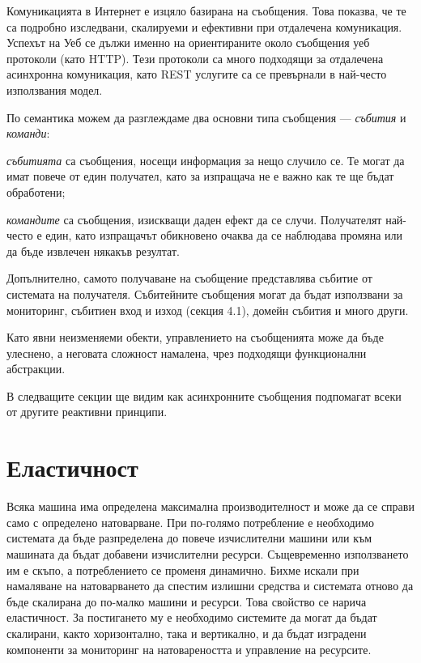 Комуникацията в Интернет е изцяло базирана на съобщения. Това показва, че те са подробно изследвани, скалируеми и ефективни при отдалечена комуникация. Успехът на Уеб се дължи именно на ориентираните около съобщения уеб протоколи (като HTTP). Тези протоколи са много подходящи за отдалечена асинхронна комуникация, като REST услугите са се превърнали в най-често използвания модел.

По семантика можем да разглеждаме два основни типа съобщения — \emph{събития} и \emph{команди}:

\begin{itemize*}
  \item \emph{събитията} са съобщения, носещи информация за нещо случило се. Те могат да имат повече от един получател, като за изпращача не е важно как те ще бъдат обработени;
  \item \emph{командите} са съобщения, изискващи даден ефект да се случи. Получателят най-често е един, като изпращачът обикновено очаква да се наблюдава промяна или да бъде извлечен някакъв резултат.
\end{itemize*}

Допълнително, самото получаване на съобщение представлява събитие от системата на получателя. Събитейните съобщения могат да бъдат използвани за мониторинг, събитиен вход и изход (секция 4.1), домейн събития и много други.

Като явни неизменяеми обекти, управлението на съобщенията може да бъде улеснено, а неговата сложност намалена, чрез подходящи функционални абстракции.

В следващите секции ще видим как асинхронните съобщения подпомагат всеки от другите реактивни принципи.

\section{Еластичност}

Всяка машина има определена максимална производителност и може да се справи само с определено натоварване. При по-голямо потребление е необходимо системата да бъде разпределена до повече изчислителни машини или към машината да бъдат добавени изчислителни ресурси. Същевременно използването им е скъпо, а потреблението се променя динамично. Бихме искали при намаляване на натоварването да спестим излишни средства и системата отново да бъде скалирана до по-малко машини и ресурси. Това свойство се нарича еластичност. За постигането му е необходимо системите да могат да бъдат скалирани, както хоризонтално, така и вертикално, и да бъдат изградени компоненти за мониторинг на натовареността и управление на ресурсите.

